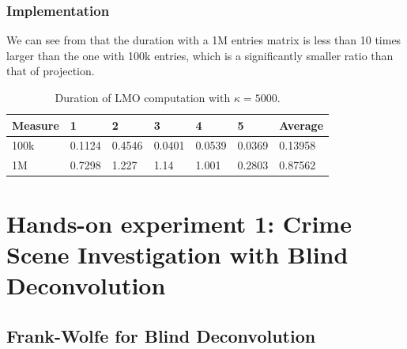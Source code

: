 \documentclass[12pt]{article}
\begin{document}
\subsubsection{Implementation}
We can see from  that the duration with a 1M entries matrix is less than 10 times larger than the one with 100k entries, which is a significantly smaller ratio than that of projection.

\begin{table}[ht]
\centering
\caption{Duration of LMO computation with $\kappa = 5000.$}
\label{tab:lmo-durations}
\begin{tabular}{lllllll}
Measure & 1 & 2 & 3 & 4 & 5 & Average \\ \hline
100k & 0.1124 & 0.4546 & 0.0401 & 0.0539 & 0.0369 & 0.13958 \\ \hline
1M & 0.7298 & 1.227 & 1.14 & 1.001 & 0.2803 & 0.87562
\end{tabular}
\end{table}

\section{Hands-on experiment 1: Crime Scene Investigation with Blind Deconvolution}

\subsection{Frank-Wolfe for Blind Deconvolution}
\end{document}
